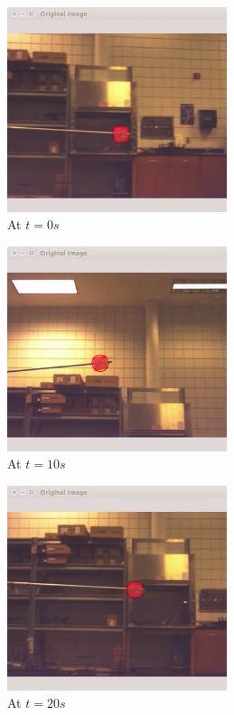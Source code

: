 \begin{figure}[htbp]
	\centering
	\begin{subfigure}{0.5\textwidth}
		\centering
		\includegraphics[height=6cm]{images/chapter2/gimbal_hardware_1.png}
		\caption{At $t=0s$}
	\end{subfigure}%
	\begin{subfigure}{0.5\textwidth}
		\centering
		\includegraphics[height=6cm]{images/chapter2/gimbal_hardware_2.png}
		\caption{At $t=10s$}
	\end{subfigure}
	\begin{subfigure}{0.5\textwidth}
		\centering
		\includegraphics[height=6cm]{images/chapter2/gimbal_hardware_3.png}
		\caption{At $t=20s$}
	\end{subfigure}%
	\begin{subfigure}{0.5\textwidth}

\end{subfigure}
\end{figure}
